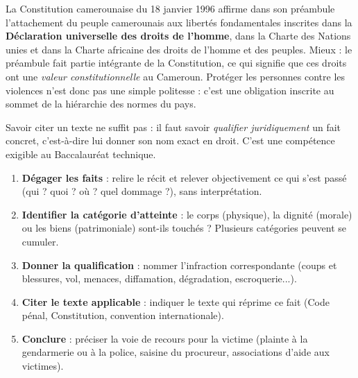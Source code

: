 \documentclass[11pt]{article}
\begin{document}
\begin{savaistu}
La Constitution camerounaise du 18 janvier 1996 affirme dans son préambule l'attachement du peuple camerounais aux libertés fondamentales inscrites dans la \textbf{Déclaration universelle des droits de l'homme}, dans la Charte des Nations unies et dans la Charte africaine des droits de l'homme et des peuples. Mieux : le préambule fait partie intégrante de la Constitution, ce qui signifie que ces droits ont une \emph{valeur constitutionnelle} au Cameroun. Protéger les personnes contre les violences n'est donc pas une simple politesse : c'est une obligation inscrite au sommet de la hiérarchie des normes du pays.
\end{savaistu}

Savoir citer un texte ne suffit pas : il faut savoir \emph{qualifier juridiquement} un fait concret, c'est-à-dire lui donner son nom exact en droit. C'est une compétence exigible au Baccalauréat technique.

\begin{methode}
\begin{enumerate}
\item \textbf{Dégager les faits} : relire le récit et relever objectivement ce qui s'est passé (qui ? quoi ? où ? quel dommage ?), sans interprétation.
\item \textbf{Identifier la catégorie d'atteinte} : le corps (physique), la dignité (morale) ou les biens (patrimoniale) sont-ils touchés ? Plusieurs catégories peuvent se cumuler.
\item \textbf{Donner la qualification} : nommer l'infraction correspondante (coups et blessures, vol, menaces, diffamation, dégradation, escroquerie...).
\item \textbf{Citer le texte applicable} : indiquer le texte qui réprime ce fait (Code pénal, Constitution, convention internationale).
\item \textbf{Conclure} : préciser la voie de recours pour la victime (plainte à la gendarmerie ou à la police, saisine du procureur, associations d'aide aux victimes).
\end{enumerate}
\end{methode}
\end{document}
